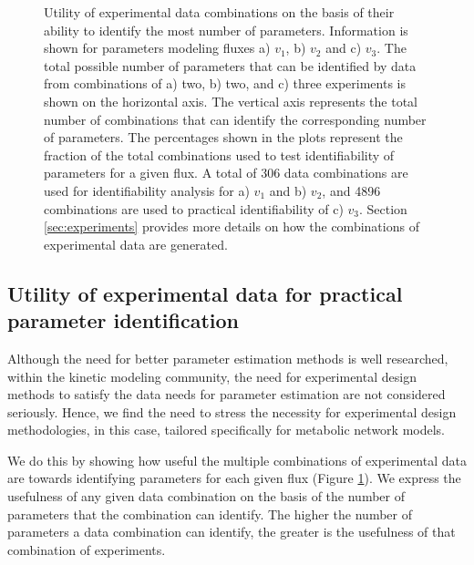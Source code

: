 \documentclass[10pt]{article}
\begin{document}
	\begin{figure}[!tbhp]
		\caption{Utility of experimental data combinations on the basis of their ability to identify the most number of parameters. Information is shown for parameters modeling fluxes a) $v_1$, b) $v_2$ and c) $v_3$. The total possible number of parameters that can be identified by data from combinations of a) two, b) two, and c) three experiments is shown on the horizontal axis. The vertical axis represents the total number of combinations that can identify the corresponding number of parameters. The percentages shown in the plots represent the fraction of the total combinations used to test identifiability of parameters for a given flux. A total of 306 data combinations are used for identifiability analysis for a) $v_1$ and b) $v_2$, and 4896 combinations are used to practical identifiability of c) $v_3$. Section \ref{sec:experiments} provides more details on how the combinations of experimental data are generated.}\label{fig:figure4}
	\end{figure}	
	\subsection{Utility of experimental data for practical parameter identification}\label{sec:data_utility}
	Although the need for better parameter estimation methods is well researched, within the kinetic modeling community, the need for experimental design methods to satisfy the data needs for parameter estimation are not considered seriously. Hence, we find the need to stress the necessity for experimental design methodologies, in this case, tailored specifically for metabolic network models. 	
	
	We do this by showing how useful the multiple combinations of experimental data are towards identifying parameters for each given flux (Figure \ref{fig:figure4}). We express the usefulness of any given data combination on the basis of the number of parameters that the combination can identify. The higher the number of parameters a data combination can identify, the greater is the usefulness of that combination of experiments. 
	
\end{document}

